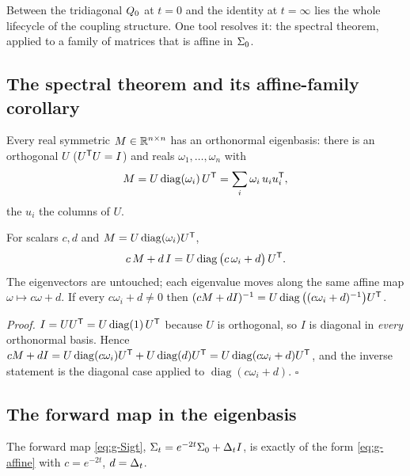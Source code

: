 Between the tridiagonal $Q_0$ at $t = 0$ and the identity at $t = \infty$ lies
the whole lifecycle of the coupling structure. One tool resolves it: the
spectral theorem, applied to a family of matrices that is affine in $\Sigma_0$.

\subsection{The spectral theorem and its affine-family corollary}

\begin{theorem}\label{thm:g-spectral}
Every real symmetric $M \in \mathbb{R}^{n\times n}$ has an orthonormal eigenbasis:
there is an orthogonal $U$ ($U^{\mathsf{T}} U = I$) and reals $\omega_1,\dots,\omega_n$
with
\begin{equation}
  M = U \operatorname{diag}(\omega_i)\, U^{\mathsf{T}}
  = \sum_{i} \omega_i\, u_i u_i^{\mathsf{T}} ,
  \label{eq:g-spectral}
\end{equation}
the $u_i$ the columns of $U$.
\end{theorem}

\begin{corollary}\label{cor:g-affine}
For scalars $c, d$ and $M = U\operatorname{diag}(\omega_i)U^{\mathsf{T}}$,
\begin{equation}
  c\,M + d\,I
  = U \operatorname{diag}\big(c\,\omega_i + d\big)\, U^{\mathsf{T}} .
  \label{eq:g-affine}
\end{equation}
The eigenvectors are untouched; each eigenvalue moves along the same affine map
$\omega \mapsto c\omega + d$. If every $c\omega_i + d \neq 0$ then
$(cM + dI)^{-1} = U\operatorname{diag}\big((c\omega_i+d)^{-1}\big)U^{\mathsf{T}}$.
\end{corollary}

\emph{Proof.} $I = U U^{\mathsf{T}} = U\operatorname{diag}(1)\,U^{\mathsf{T}}$ because $U$ is
orthogonal, so $I$ is diagonal in \emph{every} orthonormal basis. Hence
$cM + dI = U\operatorname{diag}(c\omega_i)U^{\mathsf{T}} + U\operatorname{diag}(d)U^{\mathsf{T}}
 = U\operatorname{diag}(c\omega_i + d)U^{\mathsf{T}}$, and the inverse statement is the
diagonal case applied to $\operatorname{diag}(c\omega_i + d)$. \hfill$\square$

\subsection{The forward map in the eigenbasis}

The forward map \eqref{eq:g-Sigt}, $\Sigma_t = e^{-2t}\Sigma_0 + \Delta_t I$, is
exactly of the form \eqref{eq:g-affine} with $c = e^{-2t}$, $d = \Delta_t$.

